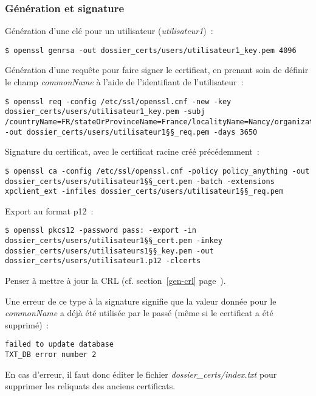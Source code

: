 \subsubsection{Génération et signature}

Génération d'une clé pour un utilisateur (\emph{utilisateur1})~:

\begin{lstlisting}
$ openssl genrsa -out dossier_certs/users/utilisateur1_key.pem 4096
\end{lstlisting}

Génération d'une requête pour faire signer le certificat, en prenant soin de définir le champ \emph{commonName} à l'aide de l'identifiant de l'utilisateur~:

\begin{lstlisting}
$ openssl req -config /etc/ssl/openssl.cnf -new -key dossier_certs/users/utilisateur1_key.pem -subj /countryName=FR/stateOrProvinceName=France/localityName=Nancy/organizationName=BHConsulting/commonName=utilisateur1/ -out dossier_certs/users/utilisateur1§§_req.pem -days 3650
\end{lstlisting}

Signature du certificat, avec le certificat racine créé précédemment~:

\begin{lstlisting}
$ openssl ca -config /etc/ssl/openssl.cnf -policy policy_anything -out dossier_certs/users/utilisateur1§§_cert.pem -batch -extensions xpclient_ext -infiles dossier_certs/users/utilisateur1§§_req.pem
\end{lstlisting}

Export au format p12~:
\begin{lstlisting}
$ openssl pkcs12 -password pass: -export -in dossier_certs/users/utilisateur1§§_cert.pem -inkey dossier_certs/users/utilisateurs1§§_key.pem -out dossier_certs/users/utilisateur1.p12 -clcerts
\end{lstlisting}

Penser à mettre à jour la CRL (cf. section~\ref{gen-crl} page~\pageref{gen-crl}).

Une erreur de ce type à la signature signifie que la valeur donnée pour le \emph{commonName} a déjà été utilisée par le passé (même si le certificat a été supprimé)~:

\begin{lstlisting}
failed to update database
TXT_DB error number 2
\end{lstlisting}

En cas d'erreur, il faut donc éditer le fichier \emph{dossier\_certs/index.txt} pour supprimer les reliquats des anciens certificats.

